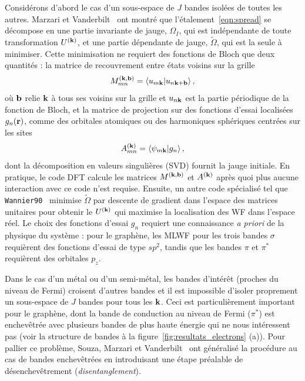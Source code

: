 Considérons d'abord le cas d'un sous-espace de $J$ bandes isolées de toutes les autres. Marzari et Vanderbilt~\cite{marzariMaximallyLocalizedGeneralized1997} ont montré que l'étalement~\eqref{eqn:spread} se décompose en une partie invariante de jauge, $\Omega_I$, qui est indépendante de toute transformation $U^{(\mathbf{k})}$, et une partie dépendante de jauge, $\widetilde{\Omega}$, qui est la seule à minimiser. Cette minimisation ne requiert des fonctions de Bloch que deux quantités : la matrice de recouvrement entre états voisins sur la grille
\begin{equation}
    M^{(\mathbf{k},\mathbf{b})}_{mn}=\braket{u_{m\mathbf{k}}}{u_{n\mathbf{k}+\mathbf{b}}},
\end{equation}
où $\mathbf{b}$ relie $\mathbf{k}$ à tous ses voisins sur la grille et $u_{n\mathbf{k}}$ est la partie périodique de la fonction de Bloch, et la matrice de projection sur des fonctions d'essai localisées $g_n(\mathbf{r})$, comme des orbitales atomiques ou des harmoniques sphériques centrées sur les sites
\begin{equation}
    A^{(\mathbf{k})}_{mn}=\braket{\psi_{m\mathbf{k}}}{g_n},
\end{equation}
dont la décomposition en valeurs singulières (SVD) fournit la jauge initiale. En pratique, le code DFT calcule les matrices $M^{(\mathbf{k},\mathbf{b})}$ et $A^{(\mathbf{k})}$ après quoi plus aucune interaction avec ce code n'est requise. Ensuite, un autre code spécialisé tel que \texttt{Wannier90}~\cite{mostofiWannier90ToolObtaining2008,mostofiUpdatedVersionWannier902014,pizziWannier90CommunityCode2020} minimise $\widetilde{\Omega}$ par descente de gradient dans l'espace des matrices unitaires pour obtenir le $U^{(\mathbf{k})}$ qui maximise la localisation des WF dans l'espace réel. Le choix des fonctions d'essai $g_n$ requiert une connaissance \textit{a priori} de la physique du système : pour le graphène, les MLWF pour les trois bandes $\sigma$ requièrent des fonctions d'essai de type $sp^2$, tandis que les bandes $\pi$ et $\pi^*$ requièrent des orbitales $p_z$.

\bigskip
{}

Dans le cas d'un métal ou d'un semi-métal, les bandes d'intérêt (proches du niveau de Fermi) croisent d'autres bandes et il est impossible d'isoler proprement un sous-espace de $J$ bandes pour tous les $\mathbf{k}$. Ceci est particulièrement important pour le graphène, dont la bande de conduction au niveau de Fermi ($\pi^*$) est enchevêtrée avec plusieurs bandes de plus haute énergie qui ne nous intéressent pas (voir la structure de bandes à la figure~\ref{fig:resultats_electrons} (a)). Pour pallier ce problème, Souza, Marzari et Vanderbilt~\cite{souzaMaximallylocalizedWannierFunctions2001} ont généralisé la procédure au cas de bandes enchevêtrées en introduisant une étape préalable de désenchevêtrement (\textit{disentanglement}).

